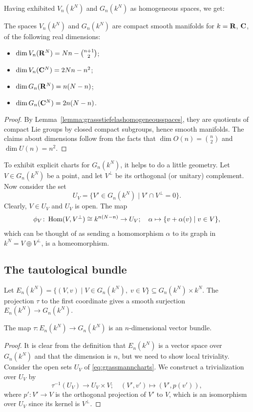 \documentclass[a4paper,openany]{scrbook}
\begin{document}
Having exhibited $V_n(k^N)$ and $G_n(k^N)$ as homogeneous spaces, we get:

\begin{thm}\label{thm:grassmannianmanifolds}
The spaces $V_n(k^N)$ and $G_n(k^N)$ are compact smooth manifolds for $k=\mathbf R$, $\mathbf C$, of the following real dimensions:
\begin{itemize}
\item $\dim V_n(\mathbf R^N) = Nn - {n+1 \choose 2}$;
\item $\dim V_n(\mathbf C^N) = 2Nn - n^2$;
\item $\dim G_n(\mathbf R^N) = n(N-n)$;
\item $\dim G_n(\mathbf C^N) = 2n(N-n)$.
\end{itemize}
\end{thm}
\begin{proof}
By Lemma~\ref{lemma:grassstiefelashomogeneousspaces}, they are quotients of compact Lie groups by closed compact subgroups, hence smooth manifolds. The claims about dimensions follow from the facts that $\dim O(n) = {n \choose 2}$ and $\dim U(n) = n^2$.
\end{proof}

To exhibit explicit charts for $G_n(k^N)$, it helps to do a little geometry. Let $V \in G_n(k^N)$ be a point, and let $V^\perp$ be its orthogonal (or unitary) complement. Now consider the set
\begin{equation}\label{eq:grassmanncharts}
U_V = \{ V' \in G_n(k^N) \mid V' \cap V^\perp = 0\}.
\end{equation}
Clearly, $V \in U_V$ and $U_V$ is open. The map
\[
\phi_V\colon \operatorname{Hom}(V,V^\perp) \cong k^{n(N-n)} \to U_V; \quad \alpha \mapsto \{v+\alpha(v) \mid v \in V\},
\]
which can be thought of as sending a homomorphism $\alpha$ to its graph in $k^N = V \oplus V^\perp$, is a homeomorphism.

\subsection{The tautological bundle}

Let $E_n(k^N) = \{ (V,v) \mid V \in G_n(k^N), \; v \in V \} \subseteq G_n(k^N) \times k^N$. The projection $\tau$ to the first coordinate gives a smooth surjection $E_n(k^N) \to G_n(k^N)$.

\begin{prop}
The map $\tau\colon E_n(k^N) \to G_n(k^N)$ is an $n$-dimensional vector bundle.
\end{prop}
\begin{proof}
It is clear from the definition that $E_n(k^N)$ is a vector space over $G_n(k^N)$ and that the dimension is $n$, but we need to show local triviality. Consider the open sets $U_V$ of \eqref{eq:grassmanncharts}. We construct a trivialization over $U_V$ by
\[
\tau^{-1}(U_V) \to U_V \times V; \quad (V',v') \mapsto (V',p(v')),
\]
where $p'\colon V' \to V$ is the orthogonal projection of $V'$ to $V$, which is an isomorphism over $U_V$ since its kernel is $V^\perp$.
\end{proof}
\end{document}
